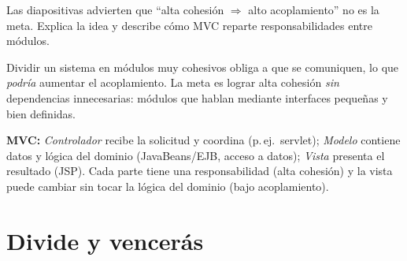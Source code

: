 \begin{prob}
Las diapositivas advierten que ``alta cohesión $\Rightarrow$ alto acoplamiento'' no es la meta. Explica la idea y describe cómo MVC reparte responsabilidades entre módulos.
\end{prob}
\begin{sol}
Dividir un sistema en módulos muy cohesivos obliga a que se comuniquen, lo que \emph{podría} aumentar el acoplamiento. La meta es lograr alta cohesión \emph{sin} dependencias innecesarias: módulos que hablan mediante interfaces pequeñas y bien definidas.

\textbf{MVC:} \emph{Controlador} recibe la solicitud y coordina (p.\,ej.\ servlet); \emph{Modelo} contiene datos y lógica del dominio (JavaBeans/EJB, acceso a datos); \emph{Vista} presenta el resultado (JSP). Cada parte tiene una responsabilidad (alta cohesión) y la vista puede cambiar sin tocar la lógica del dominio (bajo acoplamiento).
\end{sol}

\section{Divide y vencerás}

